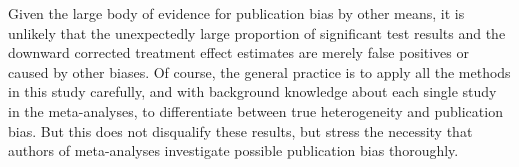\documentclass[11pt,a4paper,twoside]{book}\usepackage[]{graphicx}\usepackage[]{color}
\begin{document}
Given the large body of evidence for publication bias by other means, it is unlikely that the unexpectedly large proportion of significant test results and the downward corrected treatment effect estimates are merely false positives or caused by other biases. Of course, the general practice is to apply all the methods in this study carefully, and with background knowledge about each single study in the meta-analyses, to differentiate between true heterogeneity and publication bias. But this does not disqualify these results, but stress the necessity that authors of meta-analyses investigate possible publication bias thoroughly. 
\end{document}
